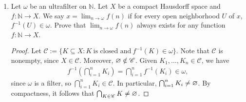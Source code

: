 \documentclass[a4paper,10pt]{report}
\newcommand{\N}{\mathbb{N}}
\begin{document}
\begin{enumerate}
\begin{enumerate}
\begin{proof}
					Finally, we must show that $\mathscr{U}$ satisfies the extension property:
					given a compact Hausdorff space $X$ and a (continuous) map $f : \N \to X$,
					there is a unique continuous extension $\widetilde{f} : \mathscr{U} \to X$:
					\begin{displaymath}
						\xymatrix{
							\mathscr{U} \ar@{-->} [rd]^-{\widetilde{f}} \\
							\N \ar[r]_-f \ar[u]^-\iota & X
						}
					\end{displaymath}
					Let $X$ be a compact Hausdorff space, and let $f : \N \to X$ be any function.
					Define $\widetilde{f} : \mathscr{U} \to X$ by
					$\widetilde{f}(\omega) := \lim_{n \to \omega}{f(n)}$ as in (2).
					By (4), $\widetilde{f}(\widehat{n}) = f(n)$ for $n \in \N$, so $\widetilde{f}$
					is a well-defined extension of $f$.
					It remains to show that $\widetilde{f}$ is continuous.
					Let $U \subseteq X$ be open.
					If $f^{-1}(U) = \es$, there is nothing to show.
					Since $X$ is a compact Hausdorff space, we may find an open set
					$V \subseteq X$ such that $\overline{V} \subseteq U$
					and $f^{-1}(V) \ne \es$.
					Let $\omega \in \widetilde{f^{-1}(V)}$.
					Then $f^{-1}(X \setminus \overline{V}) \notin \omega$,
					so $\widetilde{f}(\omega) = \lim_{n \to \omega}{f(n)} \in \overline{V} \subseteq U$.
					Thus, $\widetilde{f^{-1}(V)}$ is a nonempty open subset of $\mathscr{U}$
					such that $\widetilde{f}(\widetilde{f^{-1}(V)}) \subseteq U$,
					so $\widetilde{f}$ is continuous.
					Uniqueness of $f$ follows from the density of $\N$ in $\mathscr{U}$.
				\end{proof}
			\item Let $\omega$ be an ultrafilter on $\N$.
				Let $X$ be a compact Hausdorff space and $f : \N \to X$.
				We say $x = \lim_{n \to \omega}{f(n)}$ if for every open neighborhood $U$
				of $x$, $f^{-1}(U) \in \omega$.
				Prove that $\lim_{n \to \omega}{f(n)}$ always exists for any function $f : \N \to X$.
				\begin{proof}
					Let $\mathscr{C} :=
					\{K \subseteq X : K~\text{is closed and}~f^{-1}(K) \in \omega\}$.
					Note that $\mathscr{C}$ is nonempty, since $X \in \mathscr{C}$.
					Moreover, $\varnothing \notin \mathscr{C}$.
					Given $K_1, \dots, K_n \in \mathscr{C}$, we have
					\begin{align*}
						f^{-1}\left( \bigcap_{i=1}^n{K_i} \right)
						 = \bigcap_{i=1}^n{f^{-1}(K_i)} \in \omega,
					\end{align*}
					since $\omega$ is a filter, so $\bigcap_{i=1}^n{K_i} \in \mathscr{C}$.
					In particular, $\bigcap_{i=1}^n{K_i} \ne \varnothing$.
					By compactness, it follows that $\bigcap_{K \in \mathscr{C}}{K} \ne \varnothing$.
					

\end{proof}
\end{enumerate}
\end{enumerate}
\end{document}
